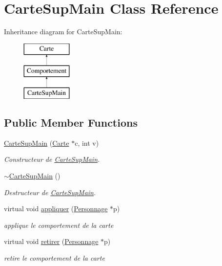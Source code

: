 \hypertarget{class_carte_sup_main}{\section{Carte\-Sup\-Main Class Reference}
\label{class_carte_sup_main}
}
Inheritance diagram for Carte\-Sup\-Main\-:\begin{figure}[H]
\begin{center}
\leavevmode
\includegraphics[height=3.000000cm]{class_carte_sup_main}
\end{center}
\end{figure}
\subsection*{Public Member Functions}
\begin{DoxyCompactItemize}
\item 
\hyperlink{class_carte_sup_main_a3b11d1f416f17dcde86201480b82b001}{Carte\-Sup\-Main} (\hyperlink{class_carte}{Carte} $\ast$c, int v)
\begin{DoxyCompactList}\small\item\em Constructeur de \hyperlink{class_carte_sup_main}{Carte\-Sup\-Main}. \end{DoxyCompactList}\item 
\hypertarget{class_carte_sup_main_a46eca6a67c7699bbea5efb219c4461f1}{\hyperlink{class_carte_sup_main_a46eca6a67c7699bbea5efb219c4461f1}{$\sim$\-Carte\-Sup\-Main} ()}\label{class_carte_sup_main_a46eca6a67c7699bbea5efb219c4461f1}

\begin{DoxyCompactList}\small\item\em Destructeur de \hyperlink{class_carte_sup_main}{Carte\-Sup\-Main}. \end{DoxyCompactList}\item 
virtual void \hyperlink{class_carte_sup_main_adc7d3cf6f6e126400abad30e874cb24e}{appliquer} (\hyperlink{class_personnage}{Personnage} $\ast$p)
\begin{DoxyCompactList}\small\item\em applique le comportement de la carte \end{DoxyCompactList}\item 
virtual void \hyperlink{class_carte_sup_main_aa2b63cb5ea72b186931bbd8f093d9e20}{retirer} (\hyperlink{class_personnage}{Personnage} $\ast$p)
\begin{DoxyCompactList}\small\item\em retire le comportement de la carte \end{DoxyCompactList}\end{DoxyCompactItemize}
